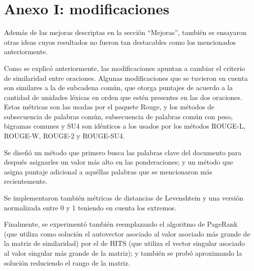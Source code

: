 \documentclass[a4paper]{article}
\begin{document}
\newpage
\section{Anexo I: modificaciones}
Además de las mejoras descriptas en la sección “Mejoras”, también se ensayaron otras ideas cuyos resultados no fueron tan destacables como los mencionados anteriormente.

Como se explicó anteriormente, las modificaciones apuntan a cambiar el criterio de similaridad entre oraciones. Algunas modificaciones que se tuvieron en cuenta son similares a la de subcadena común, que otorga puntajes de acuerdo a la cantidad de unidades léxicas en orden que estén presentes en las dos oraciones. Estas métricas son las usadas por el paquete Rouge, y los métodos de subsecuencia de palabras común, subsecuencia de palabras común con peso, bigramas comunes y SU4 son idénticos a los usados por los métodos ROUGE-L, ROUGE-W, ROUGE-2 y ROUGE-SU4.

Se diseñó un método que primero busca las palabras clave del documento para después asignarles un valor más alto en las ponderaciones; y un método que asigna puntaje adicional a aquéllas palabras que se mencionaron más recientemente.

Se implementaron también métricas de distancias de Levenshtein y una versión normalizada entre 0 y 1 teniendo en cuenta los extremos.

Finalmente, se experimentó también reemplazando el algoritmo de PageRank (que utiliza como solución el autovector asociado al valor asociado más grande de la matriz de similaridad) por el de HITS (que utiliza el vector singular asociado al valor singular más grande de la matriz); y también se probó aproximando la solución reduciendo el rango de la matriz.
\end{document}
